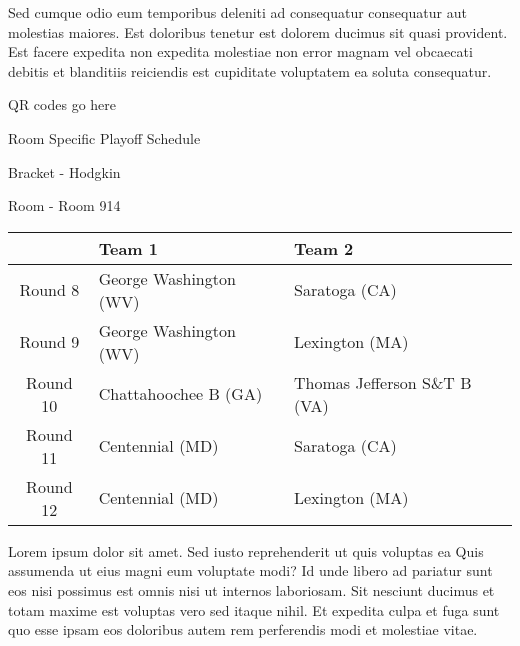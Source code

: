 \documentclass{article}%
\begin{document}
\newline%
Sed cumque odio eum temporibus deleniti ad consequatur consequatur aut molestias maiores. Est doloribus tenetur est dolorem ducimus sit quasi provident. Est facere expedita non expedita molestiae non error magnam vel obcaecati debitis et blanditiis reiciendis est cupiditate voluptatem ea soluta consequatur.%
\vspace*{140pt}%
\begin{center}%
\begin{Huge}%
QR codes go here%
\end{Huge}%
\end{center}%
\newpage%
\begin{center}%
\begin{Huge}%
Room Specific Playoff Schedule%
\end{Huge}%
\vspace*{8pt}%
\linebreak%
\begin{Large}%
Bracket {-} Hodgkin%
\end{Large}%
\vspace*{8pt}%
\linebreak%
\vspace*{8pt}%
\begin{Large}%
Room {-} Room 914%
\end{Large}%
\end{center}%
%
\begin{tabularx}{\textwidth}{|c|Y|Y|}%
\hline%
&Team 1&Team 2\\%
\hline%
Round 8&George Washington (WV)&Saratoga (CA)\\%
Round 9&George Washington (WV)&Lexington (MA)\\%
Round 10&Chattahoochee B (GA)&Thomas Jefferson S\&T B (VA)\\%
Round 11&Centennial (MD)&Saratoga (CA)\\%
Round 12&Centennial (MD)&Lexington (MA)\\%
\hline%
\end{tabularx}%
\vspace*{8pt}%
\newline%
Lorem ipsum dolor sit amet. Sed iusto reprehenderit ut quis voluptas ea Quis assumenda ut eius magni eum voluptate modi? Id unde libero ad pariatur sunt eos nisi possimus est omnis nisi ut internos laboriosam. Sit nesciunt ducimus et totam maxime est voluptas vero sed itaque nihil. Et expedita culpa et fuga sunt quo esse ipsam eos doloribus autem rem perferendis modi et molestiae vitae.\newline%
\end{document}
